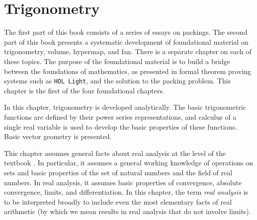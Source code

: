 

\chapter{Trigonometry}\label{part:trig}
%

\begin{summary}
The first part of this book consists of a series of essays
on packings.  The second part of this book presents
a systematic development of foundational material on
trigonometry, volume, hypermap, and fan.  There is a separate
chapter on each of these topics.  The purpose of the
foundational material is to build a bridge between
the foundations of mathematics, as presented in formal
theorem proving systems such as {\tt HOL Light}, and the
solution to the packing problem.  
This chapter is the first of the four foundational chapters.


In this chapter, trigonometry is developed analytically.  The basic
trigonometric functions are defined by their power series
representations, and calculus of a single real variable is used to
develop the basic properties of these functions.  Basic vector geometry is presented.
\end{summary}

\begin{background}\label{back:analysis}  
This chapter assumes general facts about \hypertarget{back:analysis}{real analysis} at the
level of the textbook \cite{unknown}. %
In particular, it assumes a general working knowledge
of operations on sets and  basic properties
of the set of natural numbers and the field of real numbers.  In real analysis, it
assumes basic properties of convergence, absolute convergence, limits, 
and differentiation.  In this chapter, the term {\it real analysis} is to be interpreted broadly to include even the most elementary facts of real arithmetic (by which we mean results in real analysis that do not involve limits). 
\end{background}

